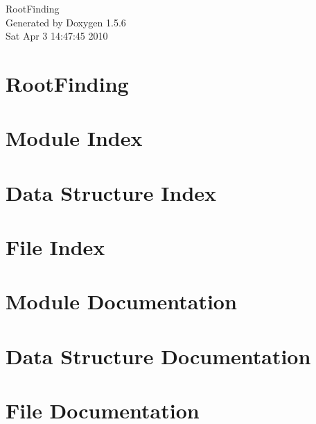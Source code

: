 \documentclass[a4paper]{article}
\begin{document}
\begin{titlepage}
\vspace*{7cm}
\begin{center}
{\Large RootFinding }\\
\vspace*{1cm}
{\large Generated by Doxygen 1.5.6}\\
\vspace*{0.5cm}
{\small Sat Apr 3 14:47:45 2010}\\
\end{center}
\end{titlepage}
\tableofcontents
{}
\section{RootFinding}
\label{index}\hypertarget{index}{}
\section{Module Index}

\section{Data Structure Index}

\section{File Index}

\section{Module Documentation}






\section{Data Structure Documentation}





\section{File Documentation}















\printindex
\end{document}
